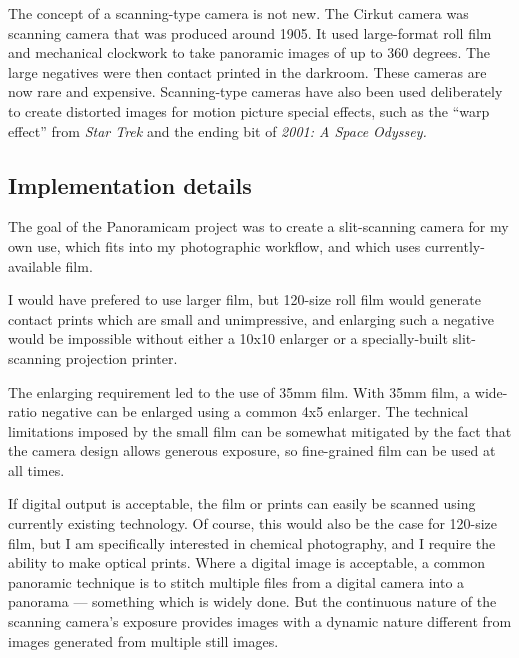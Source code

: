 \documentclass[dvips,12pt]{article}
\begin{document}
The concept of a scanning-type camera is not new. The Cirkut camera was
scanning camera that was produced around 1905. It used large-format roll
film and mechanical clockwork to take panoramic images of up to 360
degrees. The large negatives were then contact printed in the darkroom.
These cameras are now rare and expensive. Scanning-type cameras have also
been used deliberately to create distorted images for motion picture special effects, such as the ``warp effect'' from \emph{Star Trek} and the ending bit of \emph{2001: A Space Odyssey.}

\subsection{Implementation details}

The goal of the Panoramicam project was to create a slit-scanning camera for my own use, which fits into my photographic workflow, and which uses currently-available film.

I would have prefered to use larger film, but 120-size roll film would
generate contact prints which are small and unimpressive, and
enlarging such a negative would be impossible without either a 10x10
enlarger or a specially-built slit-scanning projection printer. 

The enlarging requirement led to the use of 35mm film. With 35mm film, a
wide-ratio negative can be enlarged using a common 4x5 enlarger. The
technical limitations imposed by the small film can be somewhat mitigated by the fact that the camera design allows generous exposure, so fine-grained film can be used at all times. 

If digital output is acceptable, the film or prints can easily be scanned using
currently existing technology. Of course, this would also be the case for
120-size film, but I am specifically interested in chemical photography,
and I require the ability to make optical prints. Where a digital image is
acceptable, a common panoramic technique is to stitch multiple files from a
digital camera into a panorama --- something which is widely done. But the continuous nature of the scanning camera's exposure provides images with a dynamic nature different from images generated from multiple still images.
\end{document}
